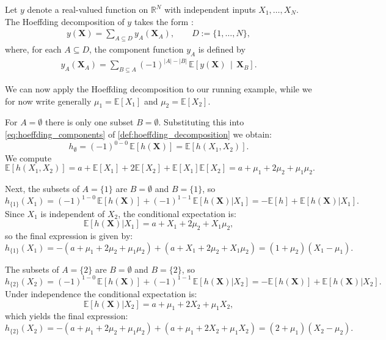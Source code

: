 \begin{definition}\label{def:hoeffding_decomposition}
Let $y$ denote a real-valued function on $\mathbb{R}^N$ with independent inputs $X_1, \dots, X_N$. The Hoeffding decomposition of $y$ takes the form \citep{ilidrissi2025}:
\begin{align}
    y(\boldsymbol{X})
=
\sum_{A \subseteq D} 
y_A(\boldsymbol{X}_A),
\qquad
D := \{1,\dots,N\},
\end{align}
where, for each $A \subseteq D$, the component function $y_A$ is defined by
\begin{align}\label{eq:hoeffding_components}
    y_A(\boldsymbol{X}_A)
=
\sum_{B \subseteq A}
(-1)^{|A|-|B|}
\,\mathbb{E}\!\left[
  y(\boldsymbol{X}) 
  \,\middle|\, 
  \boldsymbol{X}_B
\right].
\end{align}
\end{definition}

We can now apply the Hoeffding decomposition to our running example, while we for now write generally $\mu_1 = \mathbb{E}[X_1]$ and $\mu_2 = \mathbb{E}[X_2]$.\par

For $A=\emptyset$ there is only one subset $B=\emptyset$. 
Substituting this into \autoref{eq:hoeffding_components} of \autoref{def:hoeffding_decomposition} we obtain:
\[
h_{\emptyset}
=
(-1)^{0-0}\,
\mathbb{E}[h(\boldsymbol{X})]
=
\mathbb{E}[h(X_1,X_2)].
\]
We compute
\[
\mathbb{E}[h(X_1,X_2)]
= a + \mathbb{E}[X_1] + 2 \mathbb{E}[X_2] 
  + \mathbb{E}[X_1]\mathbb{E}[X_2]
= a + \mu_1 + 2\mu_2 + \mu_1\mu_2.
\]

Next, the subsets of $A=\{1\}$ are $B=\emptyset$ and $B=\{1\}$, so
\[
h_{\{1\}}(X_1)
=
(-1)^{1-0}\,\mathbb{E}[h(\boldsymbol{X})]
+
(-1)^{1-1}\,\mathbb{E}[h(\boldsymbol{X})|X_1]
=
-\mathbb{E}[h] + \mathbb{E}[h(\boldsymbol{X})|X_1].
\]
Since $X_1$ is independent of $X_2$, the conditional expectation is:
\[
\mathbb{E}[h(\boldsymbol{X})|X_1]
= a + X_1 + 2\mu_2 + X_1 \mu_2,
\]
so the final expression is given by:
\[
h_{\{1\}}(X_1)
= - (a+\mu_1+2\mu_2+\mu_1\mu_2) + (a+X_1+2\mu_2+X_1\mu_2)
= (1+\mu_2)(X_1 - \mu_1).
\]

The subsets of $A=\{2\}$ are $B=\emptyset$ and $B=\{2\}$, so
\[
h_{\{2\}}(X_2)
=
(-1)^{1-0}\,\mathbb{E}[h(\boldsymbol{X})]
+
(-1)^{1-1}\,\mathbb{E}[h(\boldsymbol{X})|X_2]
=
-\mathbb{E}[h(\boldsymbol{X})] + \mathbb{E}[h(\boldsymbol{X})|X_2].
\]
Under independence the conditional expectation is:
\[
\mathbb{E}[h(\boldsymbol{X})|X_2]
= a + \mu_1 + 2X_2 + \mu_1 X_2,
\]
which yields the final expression:
\[
h_{\{2\}}(X_2)
= - (a+\mu_1+2\mu_2+\mu_1\mu_2) + (a+\mu_1+2X_2+\mu_1 X_2)
= (2+\mu_1)(X_2 - \mu_2).
\]

